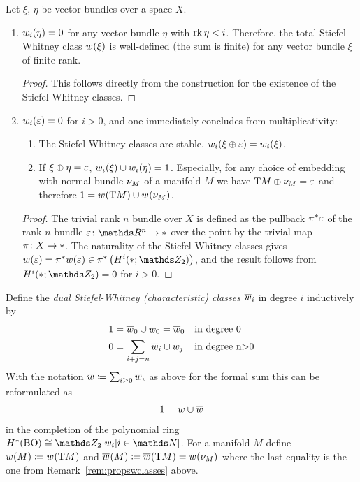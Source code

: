 \begin{Rem} %
  \label{rem:propswclasses}
  Let $\xi$, $\eta$ be vector bundles over a space $X$.
  \begin{enumerate} 
  \item ${w_{i}}(\eta) = 0$
    for any vector bundle $\eta$ with $\operatorname{rk}\eta < i$.
    Therefore, the total Stiefel-Whitney class ${w_{}}(\xi)$ is
    well-defined (\idest the sum is finite)
    for any vector bundle $\xi$ of finite rank.
    \begin{proof}
      This follows directly from the construction for the existence of
      the Stiefel-Whitney classes.
    \end{proof}
  \item ${w_{i}}(\varepsilon)=0$ for $i>0$, and one immediately concludes
    from multiplicativity:
    \begin{enumerate}
    \item The Stiefel-Whitney classes are stable, \idest
      ${w_{i}}(\xi\oplus\varepsilon) = {w_{i}}(\xi)$.
    \item\label{item:wuclassmfdinverse}
      If $\xi\oplus\eta = \varepsilon$, ${w_{i}}(\xi)\cup{w_{i}}(\eta)=1$.
      Especially, for any choice of embedding with normal bundle $\nu_{M}$
      of a manifold $M$ we have $\mathrm{T}M \oplus \nu_{M} = \varepsilon$ and
      therefore $1 = {w_{}}(\mathrm{T}M) \cup {w_{}}(\nu_{M})$.
    \end{enumerate}
    \begin{proof} %
      The trivial rank $n$ bundle over $X$ is defined as the pullback
      ${\pi}^* \varepsilon$ of the rank $n$ bundle
      $\trivbdl\colon \R^n\to\pt$ over the point by the trivial map
      $\pi\colon X\to*$. The naturality of the Stiefel-Whitney
      classes gives $\W{\trivbdl} = \pb\pi \W{\trivbdl}
      \in\pb\pi \left(\H^i(\pt;\Zmod2)\right)$,
      and the result follows from $\H^i(\pt;\Zmod2) = 0$ for $i>0$.
    \end{proof}
  \end{enumerate}
\end{Rem}

\begin{Def}
  Define the \emph{dual Stiefel-Whitney (characteristic) classes}
  $\overline{w}_{i}$ in degree $i$ inductively by
  \begin{align*}
    1 &= \overline{w}_{0}\cup w_{0} = \overline{w}_{0}    &&\text{in degree 0}\\
    0 &= \sum_{i+j=n} \overline{w}_{i}\cup w_{j}  &&\text{in degree n>0}
  \end{align*}
  With the notation $\overline{w}\coloneqq \sum_{i\geq0} \overline{w}_{i}$ as above
  for the formal sum this can be reformulated as
  \begin{gather*}
    1 = w\cup\overline{w}
  \end{gather*}
  in the completion of the polynomial ring $\H^*(\BO)\cong\Zmod2[\ws{i}|i\in\Nat]$.
  For a manifold $M$ define
  ${w_{}}(M) \coloneqq {w_{}}(\mathrm{T}M)$ and
  ${\overline{w}_{}}(M) \coloneqq {\overline{w}_{}}(\mathrm{T}M) = {w_{}}(\nu_{M})$
  where the last equality is the one from
  Remark~\autoref{rem:propswclasses} above.
\end{Def}

